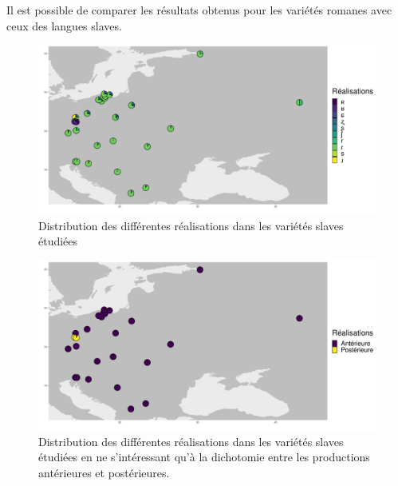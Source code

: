 Il est possible de comparer les résultats obtenus pour les variétés romanes avec ceux des langues slaves.\\
\begin{figure}
	\centering
	\includegraphics[width=1\linewidth]{substance/images/productionsalvic_1_viridis}
	\caption{Distribution des différentes réalisations dans les variétés slaves étudiées}
	\label{fig:productionsalvic1viridis}
\end{figure}

\begin{figure}
	\centering
	\includegraphics[width=1\linewidth]{substance/images/productionslavic_2_viridis}
	\caption[Distribution des différentes réalisations dans les variétés slaves pour les productions antérieures et postérieures]{Distribution des différentes réalisations dans les variétés slaves étudiées en ne s'intéressant qu'à la dichotomie entre les productions antérieures et postérieures.}
	\label{fig:productionslavic2viridis}
\end{figure}

